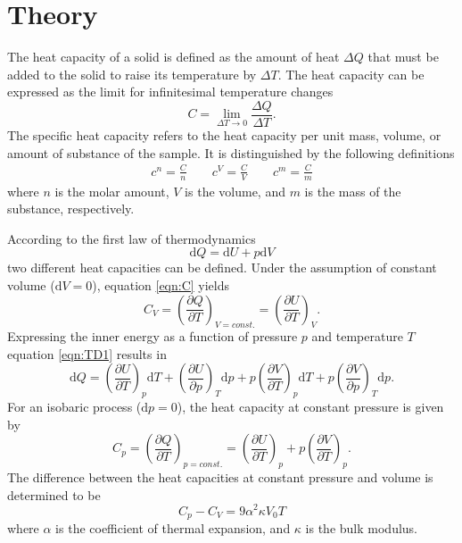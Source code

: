 \section{Theory}
\label{sec:theory}

The heat capacity of a solid is defined as the amount of 
heat $\Delta Q$ that must be added to the solid to raise 
its temperature by $\Delta T$. 
The heat capacity can be expressed as the limit for infinitesimal 
temperature changes
\begin{equation}
    C=\lim_{\Delta T\to 0}\frac{\Delta Q}{\Delta T}.
    \label{eqn:C}
\end{equation}
The specific heat capacity refers to the heat capacity per unit 
mass, volume, or amount of substance of the sample. It is 
distinguished by the following definitions
\begin{align*}
    c^n=\frac{C}{n} \qquad
    c^V=\frac{C}{V} \qquad
    c^m=\frac{C}{m}
\end{align*}
where $n$ is the molar amount, $V$ is the volume, and $m$ is 
the mass of the substance, respectively. 

According to the first law of thermodynamics
\begin{equation}
    \text{d}Q=\text{d}U+p\text{d}V
    \label{eqn:TD1}
\end{equation}
two different heat capacities can be defined. 
Under the assumption of constant volume ($\text{d}V=0$), 
equation \eqref{eqn:C} yields 
\begin{equation}
    C_V=\left(\frac{\partial Q}{\partial T}\right)_{V=const.}=\left(\frac{\partial U}{\partial T}\right)_V.
    \label{eqn:CV}
\end{equation}
Expressing the inner energy as a function of pressure $p$ and temperature $T$
equation \eqref{eqn:TD1} results in
\begin{equation*}
    \text{d}Q 
    =\left(\frac{\partial U}{\partial T}\right)_p \text{d} T 
    +\left(\frac{\partial U}{\partial p}\right)_T \text{d} p
    +p\left(\frac{\partial V}{\partial T}\right)_p \text{d} T
    +p\left(\frac{\partial V}{\partial p}\right)_T \text{d} p.
\end{equation*}
For an isobaric process ($\text{d}p=0$), the heat capacity at 
constant pressure is given by
\begin{equation}
    C_p=\left(\frac{\partial Q}{\partial T}\right)_{p=const.}
    =\left(\frac{\partial U}{\partial T}\right)_p
    +p\left(\frac{\partial V}{\partial T}\right)_p.
    \label{eqn:Cp}
\end{equation}
The difference between the heat capacities at constant pressure and volume is
determined to be
\begin{equation}
    C_p-C_V=9\alpha^2\kappa V_0T
\end{equation}
where $\alpha$ is the coefficient of thermal expansion, and $\kappa$ is the bulk modulus. 

